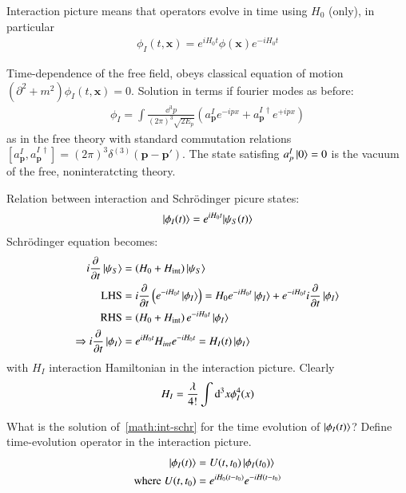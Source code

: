 Interaction picture means that operators evolve in time using $H_0$ (only), in particular 
\begin{align}
	\phi_I(t,\pmb{x}) = e^{iH_0t}\phi(\pmb{x})e^{-iH_0t}
\end{align}

Time-dependence of the free field, obeys classical equation of motion $\left(\partial^2+m^2 \right)\phi_I(t,\pmb{x}) = 0$. Solution in terms if fourier modes as before:
\begin{align}
	\phi_I = \int \frac{\dd^3 p}{(2\pi)^3\sqrt{2E_p}} (a^I_{\pmb{p}}e^{-ipx} + a^{I\,\dagger}_{\pmb{p}}e^{+ipx})
\end{align}
as in the free theory with standard commutation relations $[a^I_{\pmb{p}}, a^{I\,\dagger}_{\pmb{p}}] = (2\pi)^3\delta^{(3)}(\pmb{p}-\pmb{p}')$. The state satisfing $a^I_p \ket{0} = 0$ is the vacuum of the free, noninteratcting theory.

Relation between interaction and Schrödinger picure states:
\begin{align}
	\ket{\phi_I(t)} = e^{iH_0t}{\ket{\psi_S(t)}}
\end{align}
Schrödinger equation becomes: 
\begin{align}
	i\frac{\partial}{\partial t}\ket{\psi_S} &= (H_0 + H_\text{int})\ket{\psi_S} \notag\\
	\text{LHS} &= i \frac{\partial}{\partial t} \left( e^{-iH_0t}\ket{\phi_I} \right) = H_0 e^{-iH_0t}\ket{\phi_I} + e^{-iH_0t}i\frac{\partial}{\partial t}\ket{\phi_I} \notag\\
	\text{RHS}														&= \left(H_0 + H_\text{int}\right)e^{-iH_0t}\ket{\phi_I} \notag\\
	\Rightarrow i\frac{\partial}{\partial t}\ket{\phi_I} &= e^{iH_0t}H_{int} e^{-iH_0t} = H_I(t)\ket{\phi_I} \label{math:int-schr}
\end{align}
with $H_I$ interaction Hamiltonian in the interaction picture. Clearly
\begin{align}
	H_I = \frac{\lambda}{4!}\int\dd^3x\phi_I^4(x) \notag
\end{align}

What is the solution of~\ref{math:int-schr} for the time evolution of $\ket{\phi_I(t)}$? Define time-evolution operator in the interaction picture.
\begin{align}
	\ket{\phi_I(t)} &= U(t,t_0)\ket{\phi_I(t_0)}\label{math:int-schr2}\\
	\text{where} \; U(t,t_0) &= e^{iH_0(t-t_0)}e^{-iH(t-t_0)} 
\end{align}

